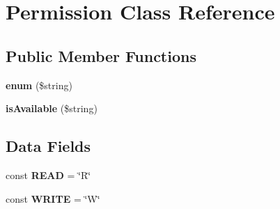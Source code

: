 \hypertarget{class_permission}{\section{Permission Class Reference}
\label{class_permission}
}
\subsection*{Public Member Functions}
\begin{DoxyCompactItemize}
\item 
\hypertarget{class_permission_a7967c6e825979f8b2faefba3d95c3821}{{\bfseries enum} (\$string)}\label{class_permission_a7967c6e825979f8b2faefba3d95c3821}

\item 
\hypertarget{class_permission_a30537daeb912ea3e348c579c4f930841}{{\bfseries is\+Available} (\$string)}\label{class_permission_a30537daeb912ea3e348c579c4f930841}

\end{DoxyCompactItemize}
\subsection*{Data Fields}
\begin{DoxyCompactItemize}
\item 
\hypertarget{class_permission_add302975378da047de904daa059a332b}{const {\bfseries R\+E\+A\+D} = \char`\"{}R\char`\"{}}\label{class_permission_add302975378da047de904daa059a332b}

\item 
\hypertarget{class_permission_aaedf1c3375abd8a1f5404863a1c57e07}{const {\bfseries W\+R\+I\+T\+E} = \char`\"{}W\char`\"{}}\label{class_permission_aaedf1c3375abd8a1f5404863a1c57e07}

\end{DoxyCompactItemize}

